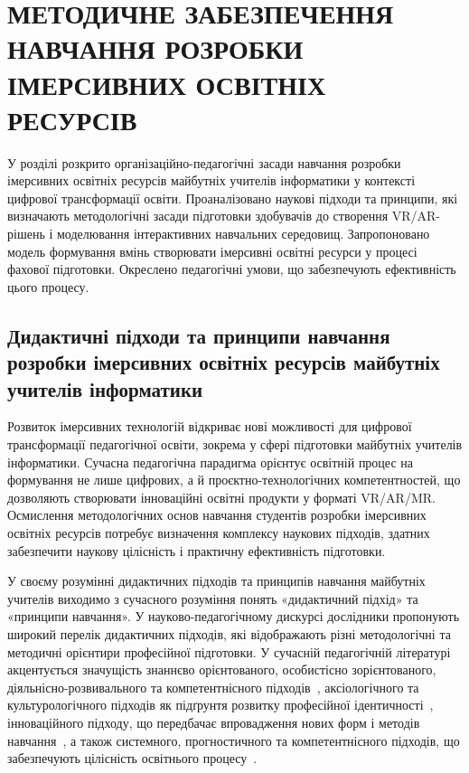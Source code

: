 \section{МЕТОДИЧНЕ ЗАБЕЗПЕЧЕННЯ НАВЧАННЯ РОЗРОБКИ ІМЕРСИВНИХ ОСВІТНІХ РЕСУРСІВ}

У розділі розкрито організаційно-педагогічні засади навчання розробки імерсивних освітніх ресурсів майбутніх учителів інформатики у контексті цифрової трансформації освіти. Проаналізовано наукові підходи та принципи, які визначають методологічні засади підготовки здобувачів до створення VR/AR-рішень і моделювання інтерактивних навчальних середовищ. Запропоновано модель формування вмінь створювати імерсивні освітні ресурси у процесі фахової підготовки. Окреслено педагогічні умови, що забезпечують ефективність цього процесу.

\subsection{Дидактичні підходи та принципи навчання розробки імерсивних освітніх ресурсів майбутніх учителів інформатики}\label{subsec:2.1}

Розвиток імерсивних технологій відкриває нові можливості для цифрової трансформації педагогічної освіти, зокрема у сфері підготовки майбутніх учителів інформатики. Сучасна педагогічна парадигма орієнтує освітній процес на формування не лише цифрових, а й проєктно-технологічних компетентностей, що дозволяють створювати інноваційні освітні продукти у форматі VR/AR/MR. Осмислення методологічних основ навчання студентів розробки імерсивних освітніх ресурсів потребує визначення комплексу наукових підходів, здатних забезпечити наукову цілісність і практичну ефективність підготовки.

У своєму розумінні дидактичних підходів та принципів навчання майбутніх учителів виходимо з сучасного розуміння понять «дидактичний підхід» та «принципи навчання». У науково-педагогічному дискурсі дослідники пропонують широкий перелік дидактичних підходів, які відображають різні методологічні та методичні орієнтири професійної підготовки. У сучасній педагогічній літературі акцентується значущість знаннєво орієнтованого, особистісно зорієнтованого, діяльнісно-розвивального та компетентнісного підходів~\cite{Kuzminskyi2012Pedagogy}, аксіологічного та культурологічного підходів як підґрунтя розвитку професійної ідентичності~\cite{Kremen2016Axiological}, інноваційного підходу, що передбачає впровадження нових форм і методів навчання~\cite{Dychkivska2012Innovative}, а також системного, прогностичного та компетентнісного підходів, що забезпечують цілісність освітнього процесу~\cite{Sysoieva2015Pedagogy}.

